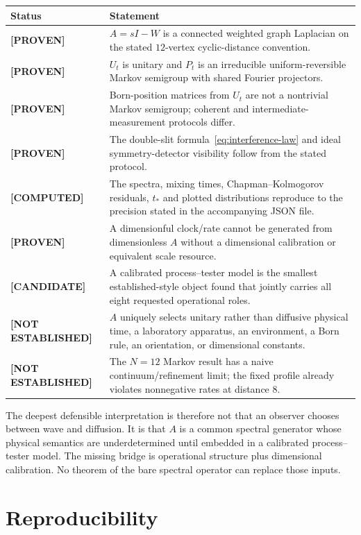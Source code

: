 \documentclass[11pt,a4paper]{article}
\theoremstyle{definition}
\theoremstyle{remark}
\newcommand{\status}[2]{\textcolor{#1}{\textbf{[#2]}}}
\newcommand{\proven}{\status{fingreen}{PROVEN}}
\newcommand{\computed}{\status{finblue}{COMPUTED}}
\newcommand{\candidate}{\status{finorange}{CANDIDATE}}
\newcommand{\notestablished}{\status{finred}{NOT ESTABLISHED}}
\begin{document}
\begin{longtable}{@{}p{}p{}@{}}
\toprule
Status & Statement\\
\midrule
\endhead
\proven & $A=sI-W$ is a connected weighted graph Laplacian on the stated $12$-vertex cyclic-distance convention.\\
\proven & $U_t$ is unitary and $P_t$ is an irreducible uniform-reversible Markov semigroup with shared Fourier projectors.\\
\proven & Born-position matrices from $U_t$ are not a nontrivial Markov semigroup; coherent and intermediate-measurement protocols differ.\\
\proven & The double-slit formula~\eqref{eq:interference-law} and ideal symmetry-detector visibility follow from the stated protocol.\\
\computed & The spectra, mixing times, Chapman--Kolmogorov residuals, $t_*$ and plotted distributions reproduce to the precision stated in the accompanying JSON file.\\
\proven & A dimensionful clock/rate cannot be generated from dimensionless $A$ without a dimensional calibration or equivalent scale resource.\\
\candidate & A calibrated process--tester model is the smallest established-style object found that jointly carries all eight requested operational roles.\\
\notestablished & $A$ uniquely selects unitary rather than diffusive physical time, a laboratory apparatus, an environment, a Born rule, an orientation, or dimensional constants.\\
\notestablished & The $N=12$ Markov result has a naive continuum/refinement limit; the fixed profile already violates nonnegative rates at distance $8$.\\
\bottomrule
\end{longtable}

The deepest defensible interpretation is therefore not that an observer chooses between wave and diffusion. It is that $A$ is a common spectral generator whose physical semantics are underdetermined until embedded in a calibrated process--tester model. The missing bridge is operational structure plus dimensional calibration. No theorem of the bare spectral operator can replace those inputs.

\section*{Reproducibility}
\end{document}
